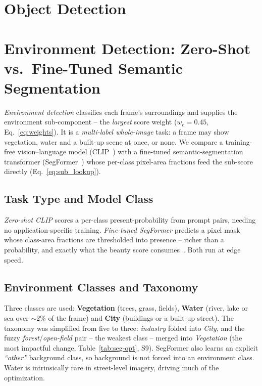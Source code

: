 \documentclass[letterpaper,journal]{IEEEtran}
\begin{document}

\clearpage
\section{Object Detection}


\clearpage
\section{Environment Detection: Zero-Shot vs.\ Fine-Tuned
Semantic Segmentation}

\emph{Environment detection} classifies each frame's surroundings and supplies the
environment sub-component -- the \emph{largest} score weight ($w_e = 0.45$,
Eq.~\eqref{eq:weights}). It is a \emph{multi-label whole-image} task: a frame may
show vegetation, water and a built-up scene at once, or none. We compare a
training-free vision--language model (CLIP~\cite{clip,urbanclip}) with a fine-tuned
semantic-segmentation transformer (SegFormer~\cite{segformer}) whose per-class
pixel-area fractions feed the sub-score directly (Eq.~\eqref{eq:sub_lookup}).

\subsection{Task Type and Model Class}
\emph{Zero-shot CLIP} scores a per-class present-probability from prompt pairs,
needing no application-specific training. \emph{Fine-tuned SegFormer} predicts a
pixel mask whose class-area fractions are thresholded into presence -- richer than a
probability, and exactly what the beauty score consumes~\cite{greenery}. Both run at
edge speed.

\subsection{Environment Classes and Taxonomy}
Three classes are used: \textbf{Vegetation} (trees, grass, fields), \textbf{Water}
(river, lake or sea over ${\sim}2\%$ of the frame) and \textbf{City} (buildings or a
built-up street). The taxonomy was simplified from five to three: \emph{industry}
folded into \emph{City}, and the fuzzy \emph{forest}/\emph{open-field} pair -- the
weakest class -- merged into \emph{Vegetation} (the most impactful change,
Table~\ref{tab:seg-opt}, S9). SegFormer also learns an explicit \emph{``other''}
background class, so background is not forced into an environment class. Water is
intrinsically rare in street-level imagery, driving much of the optimization.
\end{document}

